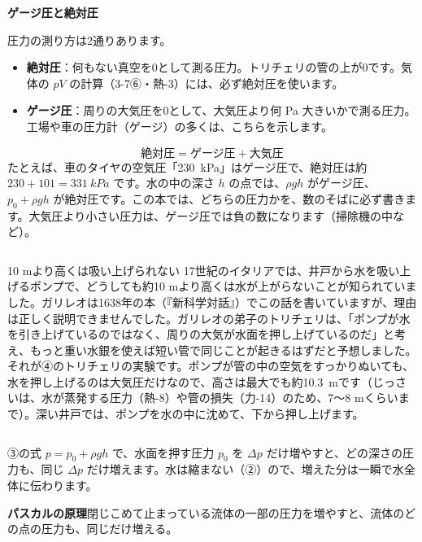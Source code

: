 \noindent\textbf{ゲージ圧と絶対圧}\par\nobreak
\label{ph:力-12:gauge}圧力の測り方は2通りあります。
\begin{itemize}[leftmargin=1.2\zw, itemsep=2pt, topsep=2pt, label={\color{bkTheme}●}]
\item \textbf{絶対圧}：何もない真空を0として測る圧力。トリチェリの管の上が0です。気体の $pV$ の計算（3-7⑥・熱-3）には、必ず絶対圧を使います。
\item \textbf{ゲージ圧}：周りの大気圧を0として、大気圧より何 Pa 大きいかで測る圧力。工場や車の圧力計（ゲージ）の多くは、こちらを示します。
\end{itemize}
\[ \text{絶対圧}=\text{ゲージ圧}+\text{大気圧} \]
たとえば、車のタイヤの空気圧「\qty{230}{kPa}」はゲージ圧で、絶対圧は約 $230+101=\qty{331}{kPa}$ です。水の中の深さ $h$ の点では、$\rho gh$ がゲージ圧、$p_0+\rho gh$ が絶対圧です。この本では、どちらの圧力かを、数のそばに必ず書きます。大気圧より小さい圧力は、ゲージ圧では負の数になります（掃除機の中など）。

\begin{column}{10 mより高くは吸い上げられない}
17世紀のイタリアでは、井戸から水を吸い上げるポンプで、どうしても約10 mより高くは水が上がらないことが知られていました。ガリレオは1638年の本（『新科学対話』）でこの話を書いていますが、理由は正しく説明できませんでした。ガリレオの弟子のトリチェリは、「ポンプが水を引き上げているのではなく、周りの大気が水面を押し上げているのだ」と考え、もっと重い水銀を使えば短い管で同じことが起きるはずだと予想しました。それが④のトリチェリの実験です。ポンプが管の中の空気をすっかりぬいても、水を押し上げるのは大気圧だけなので、高さは最大でも約\qty{10.3}{m}です（じっさいは、水が蒸発する圧力（熱-8）や管の損失（力-14）のため、7〜8 mくらいまで）。深い井戸では、ポンプを水の中に沈めて、下から押し上げます。
\end{column}


\leavevmode\label{ph:力-12:sec5}③の式 $p=p_0+\rho gh$ で、水面を押す圧力 $p_0$ を $\Delta p$ だけ増やすと、どの深さの圧力も、同じ $\Delta p$ だけ増えます。水は縮まない（②）ので、増えた分は一瞬で水全体に伝わります。
\begin{taisetsu}
\textbf{パスカルの原理}\quad 閉じこめて止まっている流体の一部の圧力を増やすと、流体のどの点の圧力も、同じだけ増える。
\end{taisetsu}

